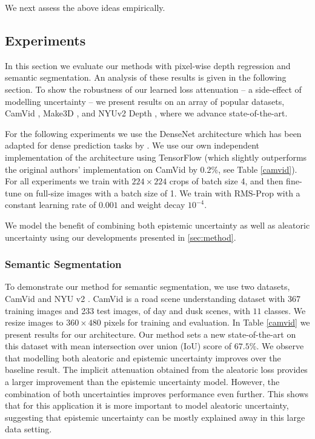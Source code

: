 We next assess the above ideas empirically.


\subsection{Experiments}
\label{sec:results}

In this section we evaluate our methods with pixel-wise depth regression and semantic segmentation. An analysis of these results is given in the following section. To show the robustness of our learned loss attenuation -- a side-effect of modelling uncertainty -- we present results on an array of popular datasets, CamVid \citep{brostow2009semantic}, Make3D \citep{saxena2009make3d}, and NYUv2 Depth \citep{silberman2012indoor}, where we advance state-of-the-art.


For the following experiments we use the DenseNet architecture \citep{huang2016densely} which has been adapted for dense prediction tasks by \citep{jegou2016one}. We use our own independent implementation of the architecture using TensorFlow \citep{abadi2016tensorflow} (which slightly outperforms the original authors' implementation on CamVid by 0.2\%, see Table \ref{camvid}). For all experiments we train with $224\times224$ crops of batch size 4, and then fine-tune on full-size images with a batch size of 1. We train with RMS-Prop with a constant learning rate of $0.001$ and weight decay $10^{-4}$.



We model the benefit of combining both epistemic uncertainty as well as aleatoric uncertainty using our developments presented in \cref{sec:method}. 

\subsubsection{Semantic Segmentation}

To demonstrate our method for semantic segmentation, we use two datasets, CamVid \citep{brostow2009semantic} and NYU v2 \citep{silberman2012indoor}. CamVid is a road scene understanding dataset with 367 training images and 233 test images, of day and dusk scenes, with $11$ classes. We resize images to $360\times480$ pixels for training and evaluation. In Table \ref{camvid} we present results for our architecture. Our method sets a new state-of-the-art on this dataset with mean intersection over union (IoU) score of $67.5\%$. We observe that modelling both aleatoric and epistemic uncertainty improves over the baseline result.  The implicit attenuation obtained from the aleatoric loss provides a larger improvement than the epistemic uncertainty model. However, the combination of both uncertainties improves performance even further. This shows that for this application it is more important to model aleatoric uncertainty, suggesting that epistemic uncertainty can be mostly explained away in this large data setting.

